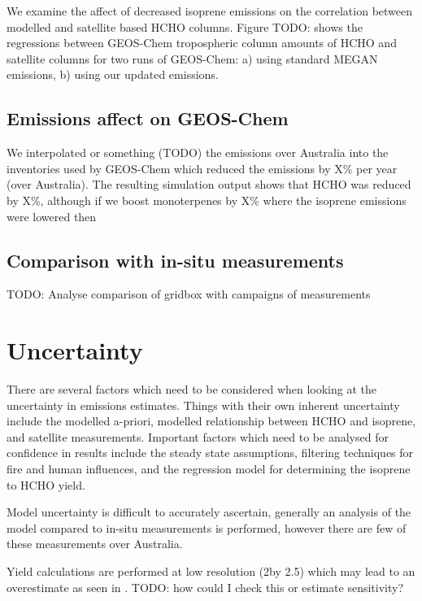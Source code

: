     We examine the affect of decreased isoprene emissions on the correlation between modelled and satellite based HCHO columns.
    Figure TODO: shows the regressions between GEOS-Chem tropospheric column amounts of HCHO and satellite columns for two runs of GEOS-Chem: a) using standard MEGAN emissions, b) using our updated emissions.
    
  \subsection{Emissions affect on GEOS-Chem}
    We interpolated or something (TODO) the emissions over Australia into the inventories used by GEOS-Chem which reduced the emissions by X\% per year (over Australia).
    The resulting simulation output shows that HCHO was reduced by X\%, although if we boost monoterpenes by X\% where the isoprene emissions were lowered then 
  
  \subsection{Comparison with in-situ measurements}
    
    TODO: %
    Analyse comparison of gridbox with campaigns of measurements
    
\section{Uncertainty}
\label{BioIsop:Uncertainty}

  There are several factors which need to be considered when looking at the uncertainty in emissions estimates.
  Things with their own inherent uncertainty include the modelled a-priori, modelled relationship between HCHO and isoprene, and satellite measurements. 
  Important factors which need to be analysed for confidence in results include the steady state assumptions, filtering techniques for fire and human influences, and the regression model for determining the isoprene to HCHO yield.
  
  Model uncertainty is difficult to accurately ascertain, generally an analysis of the model compared to in-situ measurements is performed, however there are few of these measurements over Australia.
  
  Yield calculations are performed at low resolution (2\degr by 2.5\degr) which may lead to an overestimate as seen in \textcite{Yu2016}.
  TODO: how could I check this or estimate sensitivity?
  
